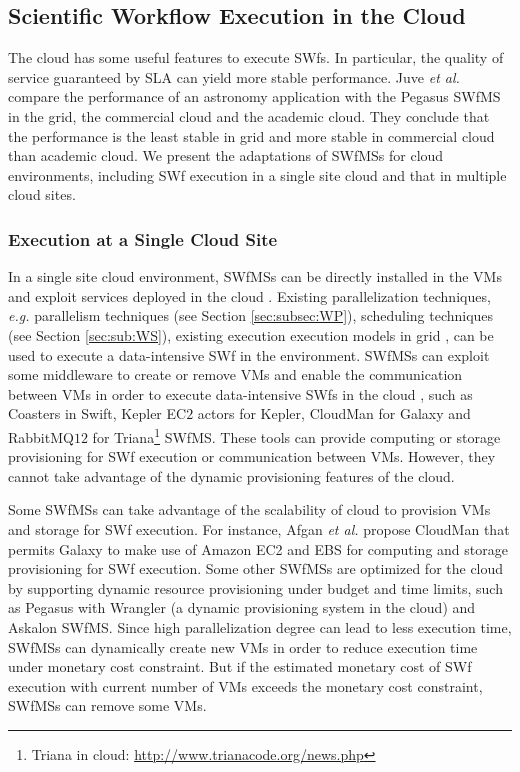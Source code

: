 \subsection{Scientific Workflow Execution in the Cloud}

The cloud has some useful features to execute SWfs. In particular, the quality of service guaranteed by SLA can yield more stable performance. Juve \textit{et al.} \cite{Juve2013} compare the performance
of an astronomy application with the Pegasus SWfMS in the grid, the
commercial cloud and the academic cloud. They conclude that the performance
is the least stable in grid and more stable in commercial cloud
than academic cloud. We present the adaptations of SWfMSs for cloud environments, including SWf execution in a single site cloud and that in multiple cloud sites.


\subsubsection{Execution at a Single Cloud Site}

In a single site cloud environment, SWfMSs can be directly installed in the VMs and exploit services deployed in the cloud \cite{Juve2011,Wolstencroft2013,Deelman2012}. Existing parallelization techniques, \textit{e.g.} parallelism techniques (see Section \ref{sec:subsec:WP}), scheduling techniques (see Section \ref{sec:sub:WS}), existing execution execution models in grid \cite{Deelman2012}, can be used to execute a data-intensive SWf in the environment. 
SWfMSs can exploit some middleware to create or remove VMs and enable the communication between VMs in order to execute data-intensive SWfs in the cloud \cite{Hategan2011,Wang2012,Afgan2010}, such as Coasters \cite{Hategan2011} in Swift, Kepler 
EC$2$ actors \cite{Wang2012} for Kepler, CloudMan \cite{Afgan2010} for Galaxy and 
RabbitMQ$12$ for Triana\footnote{Triana in cloud: \url{http://www.trianacode.org/news.php}} SWfMS. 
These tools can provide computing or storage provisioning for SWf execution or communication 
between VMs. However, they cannot take advantage of the dynamic provisioning features 
of the cloud.

Some SWfMSs can take advantage of the scalability of cloud to provision VMs and storage for SWf execution.
For instance, Afgan \textit{et al.} \cite{Afgan2010} propose CloudMan that
permits Galaxy to make use of Amazon EC2 and EBS for computing and
storage provisioning for SWf execution.
Some other SWfMSs are optimized for the cloud by supporting dynamic resource provisioning under budget and time 
limits, such as Pegasus \cite{Malawski2012,Nagavaram2011} with Wrangler \cite{Juve2011a} 
(a dynamic provisioning system in the cloud) and Askalon \cite{Ostermann2009a,Ostermann2011,Fard2013} SWfMS.
Since high parallelization degree can lead to less execution time, SWfMSs can dynamically create new VMs in order to reduce execution time under monetary cost constraint. But if the estimated monetary cost of SWf execution with current number of VMs exceeds the monetary cost constraint, SWfMSs can remove some VMs. 


